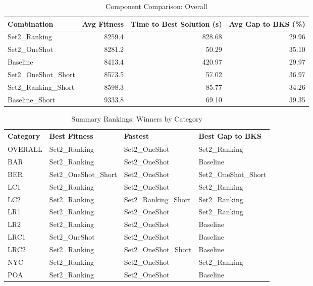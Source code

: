 \documentclass{article}
\begin{document}
\begin{table}[htbp]
\centering
\caption{Component Comparison: Overall}
\label{tab:comparison_overall}
\begin{tabular}{lrrr}
\toprule
Combination & Avg Fitness & Time to Best Solution (s) & Avg Gap to BKS (\%) \\
\midrule
Set2\_Ranking & 8259.4 & 828.68 & 29.96 \\
Set2\_OneShot & 8281.2 & 50.29 & 35.10 \\
Baseline & 8413.4 & 420.97 & 29.97 \\
Set2\_OneShot\_Short & 8573.5 & 57.02 & 36.97 \\
Set2\_Ranking\_Short & 8598.3 & 85.77 & 34.26 \\
Baseline\_Short & 9333.8 & 69.10 & 39.35 \\
\bottomrule
\end{tabular}
\end{table}

\begin{table}[htbp]
\centering
\caption{Summary Rankings: Winners by Category}
\label{tab:summary_rankings}
\begin{tabular}{llll}
\toprule
Category & Best Fitness & Fastest & Best Gap to BKS \\
\midrule
OVERALL & Set2\_Ranking & Set2\_OneShot & Set2\_Ranking \\
BAR & Set2\_Ranking & Set2\_OneShot & Baseline \\
BER & Set2\_OneShot\_Short & Set2\_OneShot & Set2\_OneShot\_Short \\
LC1 & Set2\_Ranking & Set2\_OneShot & Set2\_Ranking \\
LC2 & Set2\_Ranking & Set2\_Ranking\_Short & Set2\_Ranking \\
LR1 & Set2\_Ranking & Set2\_OneShot & Set2\_Ranking \\
LR2 & Set2\_Ranking & Set2\_OneShot & Baseline \\
LRC1 & Set2\_OneShot & Set2\_OneShot & Baseline \\
LRC2 & Set2\_Ranking & Set2\_OneShot\_Short & Baseline \\
NYC & Set2\_Ranking & Set2\_OneShot & Set2\_Ranking \\
POA & Set2\_Ranking & Set2\_OneShot & Baseline \\
\bottomrule
\end{tabular}
\end{table}
\end{document}
